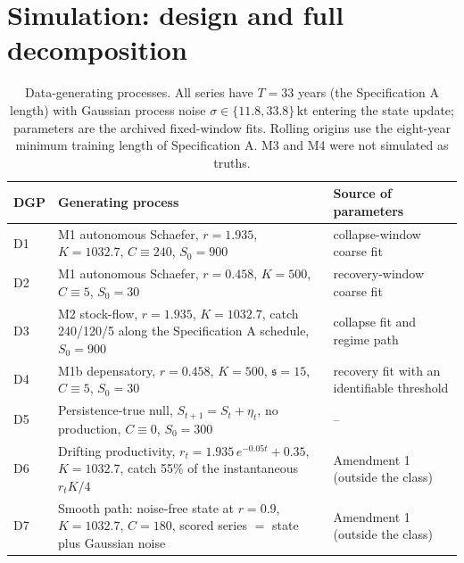 \documentclass[preprint,11pt,authoryear]{elsarticle}
\theoremstyle{remark}
\newcommand{\kt}{\,\mathrm{kt}}
\newcommand{\sA}{\mathfrak{s}}
\begin{document}
\FloatBarrier
\section{Simulation: design and full decomposition}\label{si:sim}

\begin{table}[!htb]
\centering\footnotesize\setlength{\tabcolsep}{3.5pt}
\caption{Data-generating processes. All series have $T=33$ years (the Specification A length) with Gaussian process noise $\sigma\in\{11.8, 33.8\}\kt$ entering the state update; parameters are the archived fixed-window fits. Rolling origins use the eight-year minimum training length of Specification A. M3 and M4 were not simulated as truths.}
\label{tab:si_dgp}
\begin{tabularx}{\textwidth}{@{}lLL@{}}
\toprule
DGP & Generating process & Source of parameters \\
\midrule
D1 & M1 autonomous Schaefer, $r=1.935$, $K=1032.7$, $C\equiv 240$, $S_0 = 900$ & collapse-window coarse fit \\
D2 & M1 autonomous Schaefer, $r=0.458$, $K=500$, $C\equiv 5$, $S_0 = 30$ & recovery-window coarse fit \\
D3 & M2 stock-flow, $r=1.935$, $K=1032.7$, catch 240/120/5 along the Specification A schedule, $S_0=900$ & collapse fit and regime path \\
D4 & M1b depensatory, $r=0.458$, $K=500$, $\sA=15$, $C\equiv 5$, $S_0=30$ & recovery fit with an identifiable threshold \\
D5 & Persistence-true null, $S_{t+1} = S_t + \eta_t$, no production, $C\equiv 0$, $S_0=300$ & -- \\
D6 & Drifting productivity, $r_t = 1.935\,e^{-0.05t} + 0.35$, $K=1032.7$, catch 55\% of the instantaneous $r_tK/4$ & Amendment 1 (outside the class) \\
D7 & Smooth path: noise-free state at $r=0.9$, $K=1032.7$, $C=180$, scored series $=$ state plus Gaussian noise & Amendment 1 (outside the class) \\
\bottomrule
\end{tabularx}
\end{table}
\end{document}
